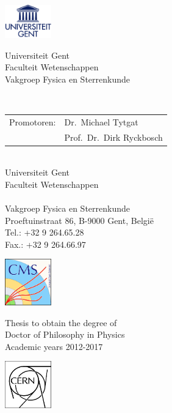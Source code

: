 \documentclass[10pt,a4paper,twoside,dutch,english]{book}                %
\begin{document}

\clearpage{\pagestyle{empty}\cleardoublepage}
\thispagestyle{empty}

\normalsize

\noindent
\begin{minipage}{3cm}%
   \includegraphics*[width=2cm]{UGentlogo}%
 \end{minipage}\hfill
 \begin{minipage}{8cm}
 \raggedleft
 \textsf{Universiteit Gent\\
 Faculteit Wetenschappen\\
 Vakgroep Fysica en Sterrenkunde}
 \end{minipage}
\\[2cm]

\noindent \begin{tabular}{ @{} l l}
Promotoren: & Dr.\ Michael Tytgat\\
 & Prof.\ Dr.\ Dirk Ryckbosch\\
\end{tabular}
\\[2cm]

\noindent Universiteit Gent \\
\noindent Faculteit Wetenschappen\\
\\[0.3cm]
\noindent Vakgroep Fysica en Sterrenkunde \\
\noindent Proeftuinstraat 86,
\noindent B-9000 Gent, Belgi\"e 
\\[0.3cm]
\noindent Tel.: +32 9 264.65.28\\
\noindent Fax.: +32 9 264.66.97

\vfill

 \begin{minipage}{2.0cm}%
     \includegraphics*[width=2.0cm]{CMS}%
 \end{minipage}\hfill
 \begin{minipage}{6cm}
 \centering
 \textsf{Thesis to obtain the degree of\\
 Doctor of Philosophy in Physics\\
 Academic years 2012-2017}
 \end{minipage}\hfill
 \begin{minipage}{2.0cm}%
     \includegraphics*[width=2.0cm]{CERN}%
 \end{minipage}\hfill
\clearpage{\pagestyle{empty}\cleardoublepage}
\end{document}

